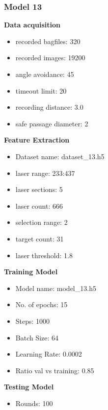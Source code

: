 \subsubsection{Model 13\label{model_13} }
\begin{multicols}{2}\textbf{Data acquisition}
\begin{itemize}
\setlength\itemsep{0.1em}
\item recorded bagfiles: 320
\item recorded images: 19200
\item angle avoidance: 45
\item timeout limit: 20
\item recording distance: 3.0
\item safe passage diameter: 2
\end{itemize}
\textbf{Feature Extraction}
\begin{itemize}
\setlength\itemsep{0.1em}
\item Dataset name: dataset\_13.h5
\item  laser range: 233:437
\item  laser sections: 5
\item  laser count: 666
\item  selection range: 2
\item  target count: 31
\item  laser threshold: 1.8
\end{itemize}
\columnbreak\textbf{Training Model}
\begin{itemize}
\setlength\itemsep{0.1em}
\item  Model name: model\_13.h5
\item  No. of epochs: 15
\item  Steps: 1000
\item  Batch Size: 64
\item  Learning Rate: 0.0002
\item  Ratio val vs training: 0.85
\end{itemize}
\textbf{Testing Model}
\begin{itemize}
\setlength\itemsep{0.1em}
\item Rounds: 100
\newline
\newline
\newline
\newline
\newline
\newline
\newline
\newline
\end{itemize}

\end{multicols}
